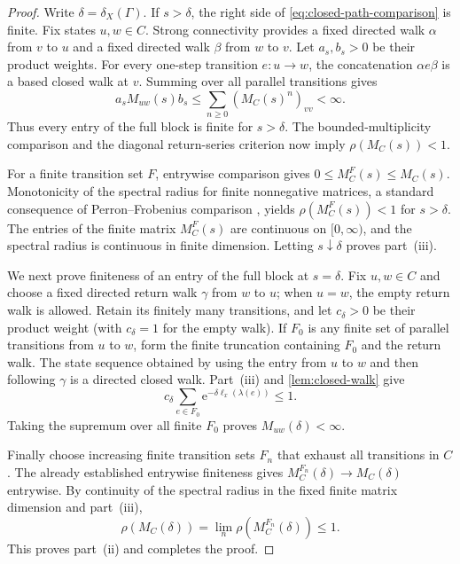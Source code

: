 \documentclass[11pt]{article}
\theoremstyle{definition}
\newcommand{\e}{\mathrm e}
\begin{document}
\begin{proof}
Write $\delta=\delta_X(\Gamma)$.  If $s>\delta$, the right side of
\eqref{eq:closed-path-comparison} is finite.  Fix states $u,w\in C$.  Strong connectivity
provides a fixed directed walk $\alpha$ from $v$ to $u$ and a fixed directed walk $\beta$
from $w$ to $v$.  Let $a_s,b_s>0$ be their product weights.  For every one-step transition
$e:u\to w$, the concatenation $\alpha e\beta$ is a based closed walk at $v$.  Summing over
all parallel transitions gives
\[
 a_s M_{uw}(s)b_s
 \le\sum_{n\ge0}(M_C(s)^n)_{vv}<\infty.
\]
Thus every entry of the full block is finite for $s>\delta$.  The bounded-multiplicity comparison and the
diagonal return-series criterion now imply $\rho(M_C(s))<1$.

For a finite transition set $F$, entrywise comparison gives
$0\le M_C^F(s)\le M_C(s)$.  Monotonicity of the spectral radius for finite nonnegative
matrices, a standard consequence of Perron--Frobenius comparison
\cite[Chapter~1]{Seneta2006}, yields $\rho(M_C^F(s))<1$ for $s>\delta$.  The entries of the
finite matrix $M_C^F(s)$ are continuous on $[0,\infty)$, and the spectral radius is continuous
in finite dimension.  Letting $s\downarrow\delta$ proves part~\textup{(iii)}.

We next prove finiteness of an entry of the full block at $s=\delta$.  Fix $u,w\in C$ and choose a fixed
directed return walk $\gamma$ from $w$ to $u$; when $u=w$, the empty return walk is
allowed.  Retain its finitely many transitions, and let $c_\delta>0$ be their product weight
(with $c_\delta=1$ for the empty walk).  If $F_0$ is any finite set of parallel transitions
from $u$ to $w$, form the finite truncation containing $F_0$ and the return walk.  The state
sequence obtained by using the entry from $u$ to $w$ and then following $\gamma$ is a
directed closed walk.  Part~\textup{(iii)} and \cref{lem:closed-walk} give
\[
 c_\delta\sum_{e\in F_0}\e^{-\delta\ell_x(\lambda(e))}\le1.
\]
Taking the supremum over all finite $F_0$ proves $M_{uw}(\delta)<\infty$.

Finally choose increasing finite transition sets $F_n$ that exhaust all transitions in $C$.
The already established entrywise finiteness gives
$M_C^{F_n}(\delta)\to M_C(\delta)$ entrywise.  By continuity of the spectral radius in the
fixed finite matrix dimension and part~\textup{(iii)},
\[
 \rho(M_C(\delta))=\lim_n\rho(M_C^{F_n}(\delta))\le1.
\]
This proves part~\textup{(ii)} and completes the proof.
\end{proof}
\end{document}
